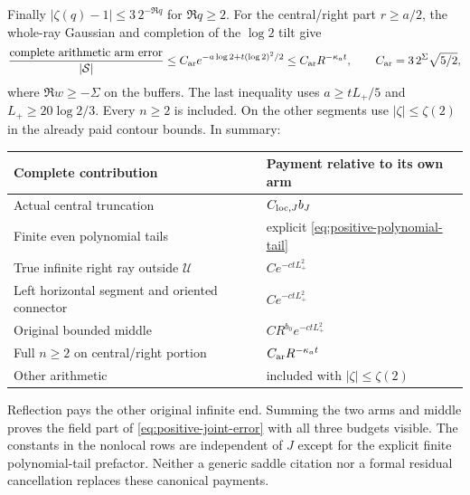 Finally $|\zeta(q)-1|\le3\,2^{-\Re q}$ for $\Re q\ge2$.
For the central/right part $r\ge a/2$, the whole-ray Gaussian and
completion of the $\log2$ tilt give
\begin{equation}
 \frac{\hbox{complete arithmetic arm error}}{|\mathcal S|}
 \le C_{\rm ar}e^{-a\log2+t(\log2)^2/2}
 \le C_{\rm ar}R^{-\kappa_at},\qquad
 C_{\rm ar}=3\,2^\Sigma\sqrt{5/2},
 \label{eq:positive-arithmetic}
\end{equation}
where $\Re w\ge-\Sigma$ on the buffers. The last inequality
uses $a\ge tL_+/5$ and $L_+\ge20\log2/3$. Every $n\ge2$
is included. On the other segments use $|\zeta|\le\zeta(2)$ in
the already paid contour bounds. In summary:
\begin{center}\small
\begin{tabular}{@{}p{}p{}@{}}\toprule
Complete contribution & Payment relative to its own arm\\\midrule
Actual central truncation & $C_{{\rm loc},J}b_J$\\
Finite even polynomial tails & explicit \eqref{eq:positive-polynomial-tail}\\
True infinite right ray outside $\mathcal U$ & $Ce^{-ctL_+^2}$\\
Left horizontal segment and oriented connector & $Ce^{-ctL_+^2}$\\
Original bounded middle & $CR^{b_0}e^{-ctL_+^2}$\\
Full $n\ge2$ on central/right portion & $C_{\rm ar}R^{-\kappa_at}$\\
Other arithmetic & included with $|\zeta|\le\zeta(2)$\\\bottomrule
\end{tabular}
\end{center}
Reflection pays the other original infinite end. Summing the two arms
and middle proves the field part of \eqref{eq:positive-joint-error}
with all three budgets visible. The constants in the nonlocal rows
are independent of $J$ except for the explicit finite polynomial-tail
prefactor. Neither a generic saddle citation nor a formal residual
cancellation replaces these canonical payments.

